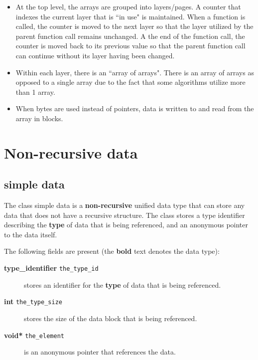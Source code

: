 \documentclass{article}
\begin{document}
\begin{itemize}
\item At the top level, the arrays are grouped into layers/pages. A counter that indexes the current layer that is ``in use" is maintained. When a function is called, the counter is moved to the next layer so that the layer utilized by the parent function call remains unchanged. A the end of the function call, the counter is moved back to its previous value so that the parent function call can continue without its layer having been changed.
\item Within each layer, there is an ``array of arrays". There is an array of arrays as opposed to a single array due to the fact that some algorithms utilize more than 1 array.
\item When bytes are used instead of pointers, data is written to and read from the array in blocks.
\end{itemize}



\section{Non-recursive data}

\subsection{simple data}

The class simple data is a \textbf{non-recursive} unified data type that can store any data that does not have a recursive structure. The class stores a type identifier describing the \textbf{type} of data that is being referenced, and an anonymous pointer to the data itself. 

The following fields are present (the \textbf{bold} text denotes the data type):
\begin{description}
\item[\textbf{type\_identifier} \texttt{the\_type\_id}] stores an identifier for the \textbf{type} of data that is being referenced.    
\item[\textbf{int} \texttt{the\_type\_size}] stores the size of the data block that is being referenced.
\item[\textbf{void*} \texttt{the\_element}] is an anonymous pointer that references the data. 
\end{description}
\end{document}
